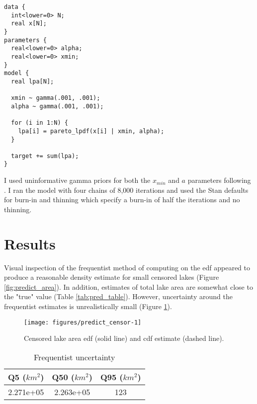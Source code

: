 \documentclass{article}
\begin{document}
\begin{minipage}[c]{0.95\textwidth}
	\begin{lstlisting}
data {
  int<lower=0> N;
  real x[N];
}
parameters {
  real<lower=0> alpha;
  real<lower=0> xmin;
}
model {
  real lpa[N];

  xmin ~ gamma(.001, .001);
  alpha ~ gamma(.001, .001);

  for (i in 1:N) {
    lpa[i] = pareto_lpdf(x[i] | xmin, alpha);
  }

  target += sum(lpa);
}
\end{lstlisting}
\end{minipage}

I used uninformative gamma priors for both the $x_{min}$ and $a$ parameters following \citet{scollnikCompositeLognormalParetoModels2007}. I ran the model with four chains of 8,000 iterations and used the Stan defaults for burn-in and thinning which specify a burn-in of half the iterations and no thinning.

\section{Results}

Visual inspection of the frequentist method of computing on the edf appeared to produce a reasonable density estimate for small censored lakes (Figure \ref{fig:predict_area}). In addition, estimates of total lake area are somewhat close to the "true" value (Table \ref{tab:pred_table}). However, uncertainty around the frequentist estimates is unrealistically small (Figure \ref{tab:frequentist_uncertainty}).

\begin{figure}
	\centering
	\texttt{[image: figures/predict\_censor-1]}
	\caption{Censored lake area edf (solid line) and cdf estimate (dashed line).}
	\label{fig:predict_censor}
\end{figure}

\begin{table}
	\caption{Frequentist uncertainty}
	\centering
	\begin{tabular}{ccc}
		\toprule
		Q5 ($km^2$) & Q50 ($km^2$) & Q95 ($km^2$) \\
		\midrule
		2.271e+05          & 2.263e+05   & 123     \\
		\bottomrule
	\end{tabular}
	\label{tab:frequentist_uncertainty}
\end{table}
\end{document}
